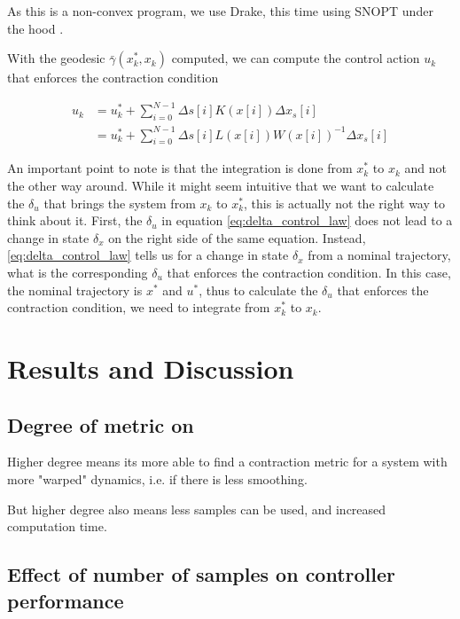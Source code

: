 \documentclass[conference]{IEEEtran}
\begin{document}
As this is a non-convex program, we use Drake, this time using SNOPT under the hood \autocite{DrakeModelBasedDesign}.

With the geodesic $\bar{\gamma}(x^*_k, x_k)$ computed, we can compute the control action $u_k$ that enforces the contraction condition

\begin{equation}
	\label{eq:control_law}
	\begin{aligned}
		u_k &= u^*_k + \sum_{i=0}^{N-1} \Delta s[i] K(x[i]) \Delta x_s[i]  \\
		&= u^*_k + \sum_{i=0}^{N-1} \Delta s[i] L(x[i]) W(x[i])^{-1} \Delta x_s[i]
	\end{aligned}
\end{equation}

An important point to note is that the integration is done from $x^*_k$ to $x_k$ and not the other way around. While it might seem intuitive that we want to calculate the $\delta_u$ that brings the system from $x_k$ to $x^*_k$, this is actually not the right way to think about it. First, the $\delta_u$ in equation \ref{eq:delta_control_law} does not lead to a change in state $\delta_x$ on the right side of the same equation. Instead, \ref{eq:delta_control_law} tells us for a change in state $\delta_x$ from a nominal trajectory, what is the corresponding $\delta_u$ that enforces the contraction condition. In this case, the nominal trajectory is $x^*$ and $u^*$, thus to calculate the $\delta_u$ that enforces the contraction condition, we need to integrate from $x^*_k$ to $x_k$.




\section{Results and Discussion}

\subsection{Degree of metric on}
Higher degree means its more able to find a contraction metric for a system with more "warped" dynamics, i.e. if there is less smoothing. 

But higher degree also means less samples can be used, and increased computation time.
\subsection{Effect of number of samples on controller performance}

\printbibliography
\end{document}
